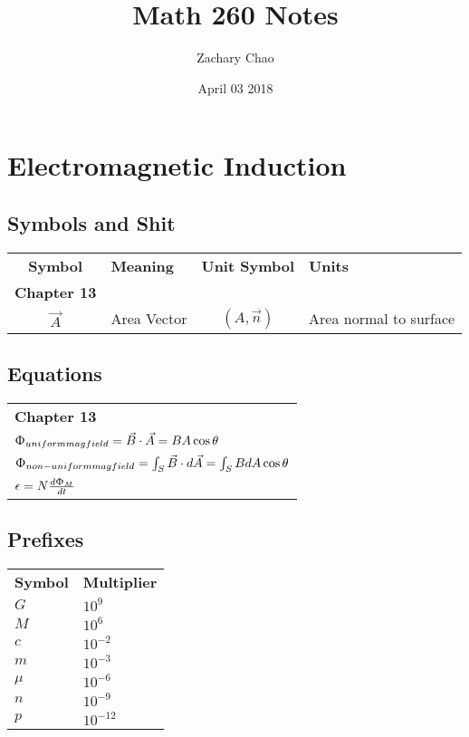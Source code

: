 \documentclass[12pt, letterpaper, twoside]{article}
\title{Math 260 Notes}
\author{Zachary Chao}
\date{April 03 2018}
\begin{document}
\setcounter{section}{12}
\section{Electromagnetic Induction}
  \subsection*{Symbols and Shit}
    \begin{tabular}{c l c l}
  	  \textbf{Symbol} & \textbf{Meaning} & \textbf{Unit Symbol} & \textbf{Units}\\
  	  \textbf{Chapter 13} & & &\\
  	  $\vec{A}$ & Area Vector & $(A, \vec{n})$ & Area normal to surface\\
  	  
    \end{tabular}
  
  \subsection*{Equations}
    \begin{tabular}{l}
    \textbf{Chapter 13}\\
      $\Upphi_{uniform mag field} = \vec{B} \cdot \vec{A} = BA \cos \theta$\\
      $\Upphi_{non-uniform mag field} = \int_S \vec{B} \cdot d \vec{A} = \int_S BdA \cos \theta$\\
      $\epsilon = N \frac{d \Upphi_M}{dt}$\\
            
    \end{tabular}
    
    
  \subsection*{Prefixes}
    \begin{tabular}{l l}
  	  \textbf{Symbol} & \textbf{Multiplier}\\
      $G$ & $10^9$\\
      $M$ & $10^6$\\
      $c$ & $10^{-2}$\\
      $m$ & $10^{-3}$\\
      $\mu$ & $10^{-6}$\\
      $n$ & $10^{-9}$\\
      $p$ & $10^{-12}$\\
  \end{tabular}
  
\end{document}
